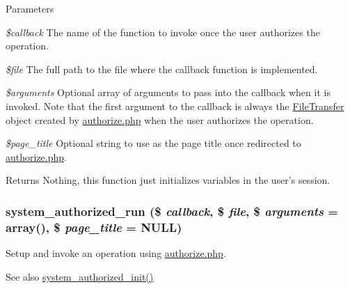 \begin{DoxyParams}{Parameters}
\item[{\em \$callback}]The name of the function to invoke once the user authorizes the operation. \item[{\em \$file}]The full path to the file where the callback function is implemented. \item[{\em \$arguments}]Optional array of arguments to pass into the callback when it is invoked. Note that the first argument to the callback is always the \hyperlink{classFileTransfer}{FileTransfer} object created by \hyperlink{authorize_8php}{authorize.php} when the user authorizes the operation. \item[{\em \$page\_\-title}]Optional string to use as the page title once redirected to \hyperlink{authorize_8php}{authorize.php}. \end{DoxyParams}
\begin{DoxyReturn}{Returns}
Nothing, this function just initializes variables in the user's session. 
\end{DoxyReturn}
\hypertarget{group__authorize_gae12fb581acdf9ef042c9137fc6de4d4c}{
\subsubsection[{system\_\-authorized\_\-run}]{\setlength{\rightskip}{0pt plus 5cm}system\_\-authorized\_\-run (\$ {\em callback}, \/  \$ {\em file}, \/  \$ {\em arguments} = {\ttfamily array()}, \/  \$ {\em page\_\-title} = {\ttfamily NULL})}}
\label{group__authorize_gae12fb581acdf9ef042c9137fc6de4d4c}
Setup and invoke an operation using \hyperlink{authorize_8php}{authorize.php}.

\begin{DoxySeeAlso}{See also}
\hyperlink{group__authorize_ga17756b29805705dbea25798d6004d5dd}{system\_\-authorized\_\-init()} 
\end{DoxySeeAlso}
